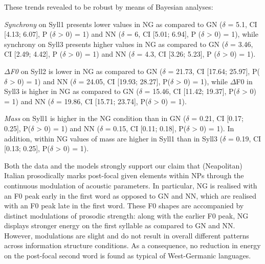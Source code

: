 \begin{styleStandard}
These trends revealed to be robust by means of Bayesian analyses:
\end{styleStandard}

\begin{listWWNumiiileveli}
\item 
\begin{stylelsBulletList}
\textit{Synchrony }on Syll1 presents lower values in NG as compared to GN ($\delta $ = 5.1, CI [4.13; 6.07], P ($\delta $ {\textgreater} 0) = 1) and NN ($\delta $ = 6, CI [5.01; 6.94], P ($\delta $ {\textgreater} 0) = 1), while synchrony on Syll3 presents higher values in NG as compared to GN ($\delta $ = 3.46, CI [2.49; 4.42], P ($\delta $ {\textgreater} 0) = 1) and NN ($\delta $ = 4.3, CI [3.26; 5.23], P ($\delta $ {\textgreater} 0) = 1).
\end{stylelsBulletList}
\item 
\begin{stylelsBulletList}
\textit{${\Delta}$F0 }on Syll2 is lower in NG as compared to GN ($\delta $ = 21.73, CI [17.64; 25.97], P($\delta $ {\textgreater} 0) = 1) and NN ($\delta $ = 24.05, CI [19.93; 28.27], P($\delta $ {\textgreater} 0) = 1), while ${\Delta}$F0 in Syll3 is higher in NG as compared to GN ($\delta $ = 15.46, CI [11.42; 19.37], P($\delta $ {\textgreater} 0) = 1) and NN ($\delta $ = 19.86, CI [15.71; 23.74], P($\delta $ {\textgreater} 0) = 1).
\end{stylelsBulletList}
\item 
\begin{stylelsBulletList}
\textit{Mass} on Syll1 is higher in the NG condition than in GN ($\delta $ = 0.21, CI [0.17; 0.25], P($\delta $ {\textgreater} 0) = 1) and NN ($\delta $ = 0.15, CI [0.11; 0.18], P($\delta $ {\textgreater} 0) = 1). In addition, within NG values of mass are higher in Syll1 than in Syll3 ($\delta $ = 0.19, CI [0.13; 0.25], P($\delta $ {\textgreater} 0) = 1).
\end{stylelsBulletList}
\end{listWWNumiiileveli}
\begin{styleStandard}
Both the data and the models strongly support our claim that (Neapolitan) Italian prosodically marks post-focal given elements within NPs through the continuous modulation of acoustic parameters. In particular, NG is realised with an F0 peak early in the first word as opposed to GN and NN, which are realised with an F0 peak late in the first word. These F0 shapes are accompanied by distinct modulations of prosodic strength: along with the earlier F0 peak, NG displays stronger energy on the first syllable as compared to GN and NN. However, modulations are slight and do not result in overall different patterns across information structure conditions. As a consequence, no reduction in energy on the post-focal second word is found as typical of West-Germanic languages. 
\end{styleStandard}

